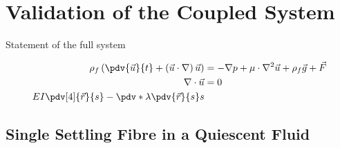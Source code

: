 \chapter{Validation of the Coupled System}

Statement of the full system

\begin{align}
    \rho_f \left( \pdv{\vec u}{t} + \left(\vec u \cdot \nabla \right) \vec u \right) & = - \nabla p + \mu \cdot \nabla^2 \vec u + \rho_f \vec g + \vec F \\
    \nabla \cdot \vec u                                                              & = 0                                                               \\
    EI \pdv[4]{\vec r}{s} - \pdv*{\lambda \pdv{\vec r}{s}}{s}
\end{align}

\section{Single Settling Fibre in a Quiescent Fluid}

